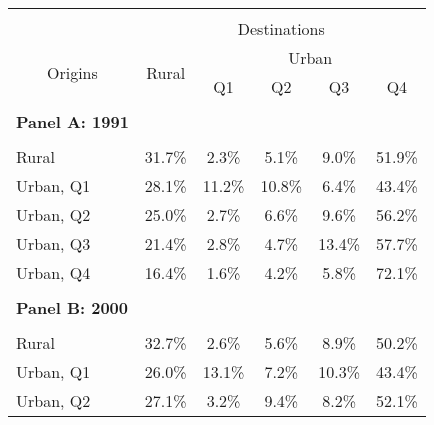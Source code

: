 \begin{tabular}{lrrrrr}
\toprule &       &       &       &       &  \\
      & \multicolumn{5}{c}{Destinations} \bigstrut[b]\\
\cline{2-6}\multicolumn{1}{c}{\multirow{2}[4]{*}{Origins}} & \multicolumn{1}{c}{\multirow{2}[4]{*}{Rural}} & \multicolumn{4}{c}{Urban} \bigstrut\\
\cline{3-6}      &       & \multicolumn{1}{c}{Q1} & \multicolumn{1}{c}{Q2} & \multicolumn{1}{c}{Q3} & \multicolumn{1}{c}{Q4} \bigstrut\\
\hline
      &       &       &       &       &  \bigstrut[t]\\
\textbf{Panel A: 1991} &       &       &       &       &  \\
      &       &       &       &       &  \\
Rural & \multicolumn{1}{c}{31.7\%} & \multicolumn{1}{c}{2.3\%} & \multicolumn{1}{c}{5.1\%} & \multicolumn{1}{c}{9.0\%} & \multicolumn{1}{c}{51.9\%} \\
Urban, Q1 & \multicolumn{1}{c}{28.1\%} & \multicolumn{1}{c}{11.2\%} & \multicolumn{1}{c}{10.8\%} & \multicolumn{1}{c}{6.4\%} & \multicolumn{1}{c}{43.4\%} \\
Urban, Q2 & \multicolumn{1}{c}{25.0\%} & \multicolumn{1}{c}{2.7\%} & \multicolumn{1}{c}{6.6\%} & \multicolumn{1}{c}{9.6\%} & \multicolumn{1}{c}{56.2\%} \\
Urban, Q3 & \multicolumn{1}{c}{21.4\%} & \multicolumn{1}{c}{2.8\%} & \multicolumn{1}{c}{4.7\%} & \multicolumn{1}{c}{13.4\%} & \multicolumn{1}{c}{57.7\%} \\
Urban, Q4 & \multicolumn{1}{c}{16.4\%} & \multicolumn{1}{c}{1.6\%} & \multicolumn{1}{c}{4.2\%} & \multicolumn{1}{c}{5.8\%} & \multicolumn{1}{c}{72.1\%} \\
      &       &       &       &       &  \\
\textbf{Panel B: 2000} &       &       &       &       &  \\
      &       &       &       &       &  \\
Rural & \multicolumn{1}{c}{32.7\%} & \multicolumn{1}{c}{2.6\%} & \multicolumn{1}{c}{5.6\%} & \multicolumn{1}{c}{8.9\%} & \multicolumn{1}{c}{50.2\%} \\
Urban, Q1 & \multicolumn{1}{c}{26.0\%} & \multicolumn{1}{c}{13.1\%} & \multicolumn{1}{c}{7.2\%} & \multicolumn{1}{c}{10.3\%} & \multicolumn{1}{c}{43.4\%} \\
Urban, Q2 & \multicolumn{1}{c}{27.1\%} & \multicolumn{1}{c}{3.2\%} & \multicolumn{1}{c}{9.4\%} & \multicolumn{1}{c}{8.2\%} & \multicolumn{1}{c}{52.1\%} \\

\end{tabular}
